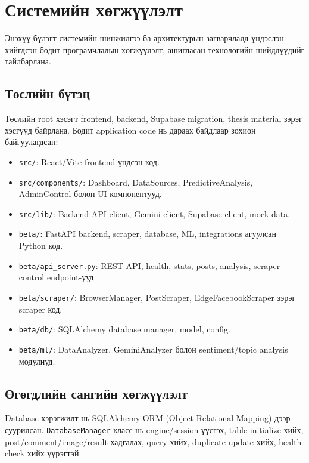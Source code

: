 \chapter{Системийн хөгжүүлэлт}
\label{Chapter4}

Энэхүү бүлэгт системийн шинжилгээ ба архитектурын загварчлалд үндэслэн хийгдсэн бодит програмчлалын хөгжүүлэлт, ашигласан технологийн шийдлүүдийг тайлбарлана.

\section{Төслийн бүтэц}

Төслийн root хэсэгт frontend, backend, Supabase migration, thesis material зэрэг хэсгүүд байрлана. Бодит application code нь дараах байдлаар зохион байгуулагдсан:

\begin{itemize}
    \item \texttt{src/}: React/Vite frontend үндсэн код.
    \item \texttt{src/components/}: Dashboard, DataSources, PredictiveAnalysis, AdminControl болон UI компонентууд.
    \item \texttt{src/lib/}: Backend API client, Gemini client, Supabase client, mock data.
    \item \texttt{beta/}: FastAPI backend, scraper, database, ML, integrations агуулсан Python код.
    \item \texttt{beta/api\_server.py}: REST API, health, stats, posts, analysis, scraper control endpoint-ууд.
    \item \texttt{beta/scraper/}: BrowserManager, PostScraper, EdgeFacebookScraper зэрэг scraper код.
    \item \texttt{beta/db/}: SQLAlchemy database manager, model, config.
    \item \texttt{beta/ml/}: DataAnalyzer, GeminiAnalyzer болон sentiment/topic analysis модулиуд.
\end{itemize}

\section{Өгөгдлийн сангийн хөгжүүлэлт}

Database хэрэгжилт нь SQLAlchemy ORM (Object-Relational Mapping) дээр суурилсан. \texttt{DatabaseManager} класс нь engine/session үүсгэх, table initialize хийх, post/comment/image/result хадгалах, query хийх, duplicate update хийх, health check хийх үүрэгтэй.

